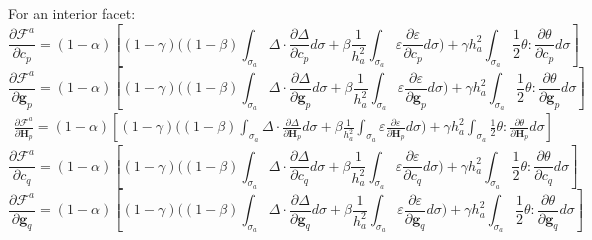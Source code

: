 \documentclass[11pt]{article} %
\begin{document}
For an interior facet:
\begin{equation}
	\frac{\partial \mathcal{F}^a}{\partial c_p} = (1-\alpha) \left[ (1-\gamma) \bigg( (1-\beta) \int_{\sigma_a} \Delta \cdot \frac{\partial \Delta}{\partial c_p} d \sigma + \beta \frac{1}{h_a^2} \int_{\sigma_a} \varepsilon \frac{\partial \varepsilon}{\partial c_p} d \sigma \bigg) + \gamma h_a^2 \int_{\sigma_a} \frac{1}{2} \theta \colon \frac{\partial \theta}{\partial c_p} d \sigma \right]
\end{equation}
\begin{equation}
	\frac{\partial \mathcal{F}^a}{\partial \mathbf{g}_p} = (1-\alpha) \left[ (1-\gamma) \bigg( (1-\beta) \int_{\sigma_a} \Delta \cdot \frac{\partial \Delta}{\partial \mathbf{g}_p} d \sigma + \beta \frac{1}{h_a^2} \int_{\sigma_a} \varepsilon \frac{\partial \varepsilon}{\partial \mathbf{g}_p} d \sigma \bigg) + \gamma h_a^2 \int_{\sigma_a} \frac{1}{2} \theta \colon \frac{\partial \theta}{\partial \mathbf{g}_p} d \sigma \right]
\end{equation}
\begin{eqnarray}
	\frac{\partial \mathcal{F}^a}{\partial \mathbf{H}_p} = (1-\alpha) \left[ (1-\gamma) \bigg( (1-\beta) \int_{\sigma_a} \Delta \cdot \frac{\partial \Delta}{\partial \mathbf{H}_p} d \sigma + \beta \frac{1}{h_a^2} \int_{\sigma_a} \varepsilon \frac{\partial \varepsilon}{\partial \mathbf{H}_p} d \sigma \bigg) + \gamma h_a^2 \int_{\sigma_a} \frac{1}{2} \theta \colon \frac{\partial \theta}{\partial \mathbf{H}_p} d \sigma \right]
\end{eqnarray}
\begin{equation}
	\frac{\partial \mathcal{F}^a}{\partial c_q} = (1-\alpha) \left[ (1-\gamma) \bigg( (1-\beta) \int_{\sigma_a} \Delta \cdot \frac{\partial \Delta}{\partial c_q} d \sigma + \beta \frac{1}{h_a^2} \int_{\sigma_a} \varepsilon \frac{\partial \varepsilon}{\partial c_q} d \sigma \bigg) + \gamma h_a^2 \int_{\sigma_a} \frac{1}{2} \theta \colon \frac{\partial \theta}{\partial c_q} d \sigma \right]
\end{equation}
\begin{equation}
	\frac{\partial \mathcal{F}^a}{\partial \mathbf{g}_q} = (1-\alpha) \left[ (1-\gamma) \bigg( (1-\beta) \int_{\sigma_a} \Delta \cdot \frac{\partial \Delta}{\partial \mathbf{g}_q} d \sigma + \beta \frac{1}{h_a^2} \int_{\sigma_a} \varepsilon \frac{\partial \varepsilon}{\partial \mathbf{g}_q} d \sigma \bigg) + \gamma h_a^2 \int_{\sigma_a} \frac{1}{2} \theta \colon \frac{\partial \theta}{\partial \mathbf{g}_q} d \sigma \right]
\end{equation}
\end{document}
